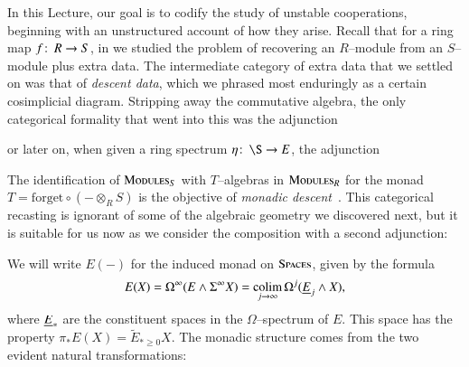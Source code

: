 In this Lecture, our goal is to codify the study of unstable cooperations, beginning with an unstructured account of how they arise.  Recall that for a ring map $f\colon\thinspace R \to S$, in  we studied the problem of recovering an $R$--module from an $S$--module plus extra data.  The intermediate category of extra data that we settled on was that of \textit{descent data}, which we phrased most enduringly as a certain cosimplicial diagram.  Stripping away the commutative algebra, the only categorical formality that went into this was the adjunction
\begin{center}
\end{center}
or later on, when given a ring spectrum $\eta\co \S \to E$, the adjunction
\begin{center}
\end{center}
The identification of $\normalfont\textsc{Modules}_S$ with $T$--algebras in $\normalfont\textsc{Modules}_R$ for the monad $T = \mathrm{forget} \circ (- \otimes_R S)$ is the objective of \textit{monadic descent}~\cite[Theorem 4.7.4.5]{LurieHA}.  This categorical recasting is ignorant of some of the algebraic geometry we discovered next, but it is suitable for us now as we consider the composition with a second adjunction:
\begin{center}
\end{center}
We will write $E(-)$ for the induced monad on $\normalfont\textsc{Spaces}$, given by the formula \[E(X) = \Omega^\infty (E \wedge \Sigma^\infty X) = \operatorname*{colim}_{j \to \infty} \Omega^j (\underline{\smash{E}}_{j} \wedge X),\] where $\underline{\smash{E}}_{*}$ are the constituent spaces in the $\Omega$--spectrum of $E$.  This space has the property $\pi_* E(X) = \widetilde E_{* \ge 0} X$.  The monadic structure comes from the two evident natural transformations:
